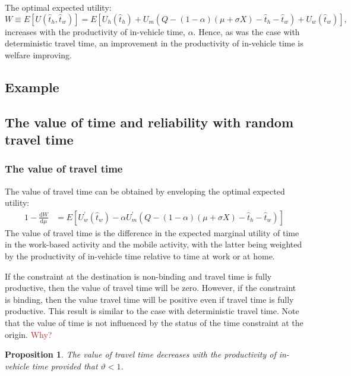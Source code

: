 \documentclass[12pt,a4paper,british]{article}
\newtheorem{prop}{Proposition}[section]
\begin{document}
The optimal expected utility: 
\begin{equation*}
W\equiv E\left[U\left(\hat{t}_{h},\hat{t}_{w}\right)\right]=E\left[U_{h}\left(\hat{t}_{h}\right)+U_{m}\left(Q-\left(1-\alpha\right)\left(\mu+\sigma X\right)-\hat{t}_{h}-\hat{t}_{w}\right)+U_{w}\left(\hat{t}_{w}\right)\right],
\end{equation*}
increases with the productivity of in-vehicle time, $\alpha$. Hence, as was the case with deterministic travel time, an improvement in
the productivity of in-vehicle time is welfare improving.

\subsection{Example}

\subsection{The value of time and reliability with random travel time}

\subsubsection*{The value of travel time}

The value of travel time can be obtained by enveloping the optimal expected utility:
\begin{alignat*}{1}
-\frac{\mathrm{d}W}{\mathrm{d}\mu} & =E\left[U_{w}^{\prime}\left(\hat{t}_{w}\right)-\alpha U_{m}^{\prime}\left(Q-\left(1-\alpha\right)\left(\mu+\sigma X\right)-\hat{t}_{h}-\hat{t}_{w}\right)\right]
\end{alignat*}
The value of travel time is the difference in the expected marginal utility of time in the work-based activity and the mobile activity,
with the latter being weighted by the productivity of in-vehicle time relative to time at work or at home. 

If the constraint at the destination is non-binding and travel time is fully productive, then the value of travel time will be zero. However, if the constraint is binding, then the value travel time will be positive even if travel time is fully productive. This result is similar to the case with deterministic travel time. Note that the value of time is not influenced by the status of the time constraint at the origin.
\textcolor{brown}{Why?}
\begin{prop}
The value of travel time decreases with the productivity of in-vehicle time provided that $\vartheta<1$. 
\end{prop}
\end{document}

